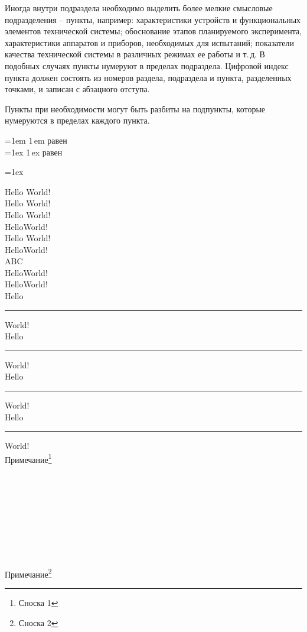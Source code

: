 Иногда внутри подраздела необходимо выделить более мелкие смысловые подразделения – пункты, например: характеристики устройств и функциональных элементов технической системы; обоснование этапов планируемого эксперимента, характеристики аппаратов и приборов, необходимых для испытаний; показатели качества технической системы в различных режимах ее работы и т.\,д. В подобных случаях пункты нумеруют в пределах подраздела. Цифровой индекс пункта должен состоять из номеров раздела, подраздела и пункта, разделенных точками, и записан с абзацного отступа. 

Пункты при необходимости могут быть разбиты на подпункты, которые нумеруются в пределах каждого пункта. 

\noindent\newlength{\ldn}%
\ldn=1em 1\,em равен \the\ldn\\
\ldn=1ex 1\,ex равен \the\ldn

\newlength{\ldm}\settowidth{\ldm}{M}\the\ldm

{ 
\fboxrule=1ex
}

\noindent Hello World!\\
\hspace{10mm}Hello World!\\
\hspace*{10mm}Hello World!\\
Hello\hspace*{-2mm}World!\\


Hello World!\\
Hello\hfill World!\\
A\hfill\hfill{}B\hfill{}C\\
Hello\dotfill{}World!\\
Hello\hrulefill{}World!\\

Hello\rule{1cm}{.3pt}World!\\
Hello \rule{10pt}{10pt} World!\\
Hello \rule[2pt]{1cm}{3pt} World!\\
Hello \rule[-2pt]{1cm}{3pt} World!\\
Примечание\footnote{Сноска 1}

\the\doublehyphendemerits\\
\the\finalhyphendemerits\\
\the\righthyphenmin\\
\the\lefthyphenmin\\
\the\clubpenalty\\
\the\widowpenalty\\
\the\pretolerance\\
\the\tolerance\\
Примечание\footnote{Сноска 2}


